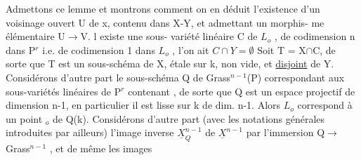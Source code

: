 Admettons  ce lemme  et montrons comment on en déduit  l'existence
d'un voisinage ouvert U de x, contenu dans X-Y, et admettant un morphis-%
me élémentaire U$\longrightarrow$V.  
 l existe une sous-%
variété linéaire C de $L_o$ , de codimension n dans P$^r$ i.e. de codimension
1 dans $L_o$ ,  
 l'on ait  $C \cap Y = \emptyset$  
 Soit  T = X$\cap$C, de sorte que T est un sous-schéma de X,
étale sur k, non vide, et \uline{disjoint} de Y.  Considérons d'autre part le
sous-schéma Q de Grass$^{n-1}$(P) correspondant aux sous-variétés linéaires
de P$^r$ contenant , de sorte que  Q est un  espace projectif
de dimension n-1,   en particulier il est lisse sur k de dim. n-1.
Alors $L_o$ correspond à un point \hand{$\xi$}$_o$ de Q(k).  Considérons d'autre part
(avec les notations générales introduites par ailleurs)  l'image inverse
$\underline{X}^{n-1}_Q$ de $\underline{X}^{n-1}$  par  l'immersion Q$\longrightarrow$ Grass$^{n-1}$ , et de même les images

